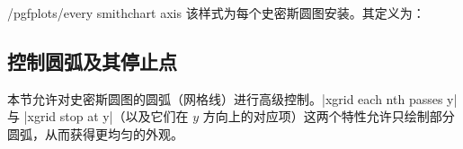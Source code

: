 \begin{stylekey}{/pgfplots/every smithchart axis}
    该样式为每个史密斯圆图安装。其定义为：
\begin{codeexample}
\end{codeexample}
\end{stylekey}


\subsection{控制圆弧及其停止点}

本节允许对史密斯圆图的圆弧（网格线）进行高级控制。|xgrid each nth passes y|
与 |xgrid stop at y|（以及它们在 $y$ 方向上的对应项）这两个特性允许只绘制部分
圆弧，从而获得更均匀的外观。

